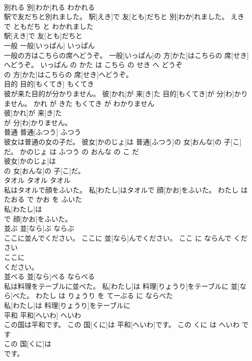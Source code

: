\documentclass[8pt]{extreport}
\begin{document}
\begin{CJK}{UTF8}{min}
\\	別れる	別[わか]れる	わかれる	
\\	駅で友だちと別れました。	駅[えき]で 友[とも]だちと 別[わか]れました。	えき で ともだち と わかれました	
\\	駅[えき]で 友[とも]だちと
\\	一般	一般[いっぱん]	いっぱん	
\\	一般の方はこちらの席へどうぞ。	一般[いっぱん]の 方[かた]はこちらの 席[せき]へどうぞ。	いっぱん の かた は こちら の せき へ どうぞ	
\\	の 方[かた]はこちらの 席[せき]へどうぞ。			
\\	目的	目的[もくてき]	もくてき	
\\	彼が来た目的が分かりません。	彼[かれ]が 来[き]た 目的[もくてき]が 分[わ]かりません。	かれ が きた もくてき が わかりません	
\\	彼[かれ]が 来[き]た
\\	が 分[わ]かりません。			
\\	普通	普通[ふつう]	ふつう	
\\	彼女は普通の女の子だ。	彼女[かのじょ]は 普通[ふつう]の 女[おんな]の 子[こ]だ。	かのじょ は ふつう の おんな の こ だ	
\\	彼女[かのじょ]は
\\	の 女[おんな]の 子[こ]だ。			
\\	タオル	タオル	タオル	
\\	私はタオルで顔をふいた。	私[わたし]はタオルで 顔[かお]をふいた。	わたし は たおる で かお を ふいた	
\\	私[わたし]は
\\	で 顔[かお]をふいた。			
\\	並ぶ	並[なら]ぶ	ならぶ	
\\	ここに並んでください。	ここに 並[なら]んでください。	ここ に ならんで ください	
\\	ここに
\\	ください。			
\\	並べる	並[なら]べる	ならべる	
\\	私は料理をテーブルに並べた。	私[わたし]は 料理[りょうり]をテーブルに 並[なら]べた。	わたし は りょうり を てーぶる に ならべた	
\\	私[わたし]は 料理[りょうり]をテーブルに
\\	平和	平和[へいわ]	へいわ	
\\	この国は平和です。	この 国[くに]は 平和[へいわ]です。	この くに は へいわ です	
\\	この 国[くに]は
\\	です。			

\end{CJK}
\end{document}
